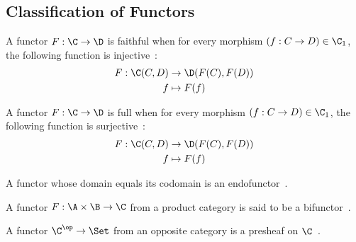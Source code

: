 \subsection{Classification of Functors}

\begin{definition}
  A functor $F:\C\to \D$ is faithful when for every morphism $(f: C\to D) \in
  \C_1$, the following function is
  injective~\parencite[p.~25]{leinster:basic_category_theory}:
    \[
      \begin{aligned}
        F: \C(C, D) &\to \D(F(C), F(D))\\
        f &\mapsto F(f)
      \end{aligned}
    \]
\end{definition}

\begin{definition}
  A functor $F:\C\to \D$ is full when for every morphism $(f: C\to D) \in
  \C_1$, the following function is
  surjective~\parencite[p.~25]{leinster:basic_category_theory}:
  \[
    \begin{aligned}
      F: \C(C, D) &\to \D(F(C), F(D))\\
      f &\mapsto F(f)
    \end{aligned}
  \]
\end{definition}

\begin{definition}[Endofunctor]
  A functor whose domain equals its codomain is an
  endofunctor~\parencite[p.~30]{adamek_herrlich_strecker:joy_cats}.
\end{definition}

\begin{definition}[Bifunctor]
  A functor $F:\A\times \B \to \C$ from a product category is said to be a
  bifunctor~\parencite[p.~37]{lane:working_mathematician}.
\end{definition}

\begin{definition}[Presheaf]
  A functor $\C^\op \to \Set$ from an opposite category is a presheaf on
  $\C$~\parencite[p.~24]{leinster:basic_category_theory}.
\end{definition}

